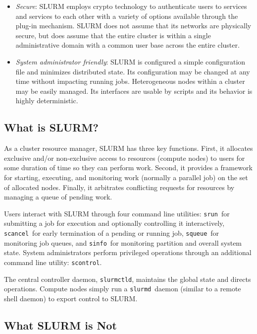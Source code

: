 \documentclass{article}
\newcommand{\srun}{{\tt srun}}
\newcommand{\scancel}{{\tt scancel}}
\newcommand{\squeue}{{\tt squeue}}
\newcommand{\sinfo}{{\tt sinfo}}
\newcommand{\slurmd}{{\tt slurmd}}
\begin{document}
\begin{itemize}
\item {\em Secure}: SLURM employs crypto technology to authenticate 
users to services and services to each other with a variety of options 
available through the plug-in mechanism.  
SLURM does not assume that its networks are physically secure, 
but does assume that the entire cluster is within a single 
administrative domain with a common user base across the 
entire cluster.

\item {\em System administrator friendly}: SLURM is configured a 
simple configuration file and minimizes distributed state.  
Its configuration may be changed at any time without impacting running jobs. 
Heterogeneous nodes within a cluster may be easily managed.
Its interfaces are usable by scripts and its behavior is highly 
deterministic.

\end{itemize}

\subsection{What is SLURM?}

As a cluster resource manager, SLURM has three key functions.  First,
it allocates exclusive and/or non-exclusive access to resources 
(compute nodes) to users for 
some duration of time so they can perform work.  Second, it provides 
a framework for starting, executing, and monitoring work (normally a 
parallel job) on the set of allocated nodes.  Finally, it arbitrates 
conflicting requests for resources by managing a queue of pending work.

Users interact with SLURM through four command line utilities: 
\srun\ for submitting a job for execution and optionally controlling it
interactively, 
\scancel\ for early termination of a pending or running job, 
\squeue\ for monitoring job queues, and 
\sinfo\ for monitoring partition and overall system state.
System administrators perform privileged operations through an additional
command line utility: {\tt scontrol}.

The central controller daemon, {\tt slurmctld}, maintains the global state 
and directs operations.
Compute nodes simply run a \slurmd\ daemon (similar to a remote shell 
daemon) to export control to SLURM.  

\subsection{What SLURM is Not}
\end{document}
